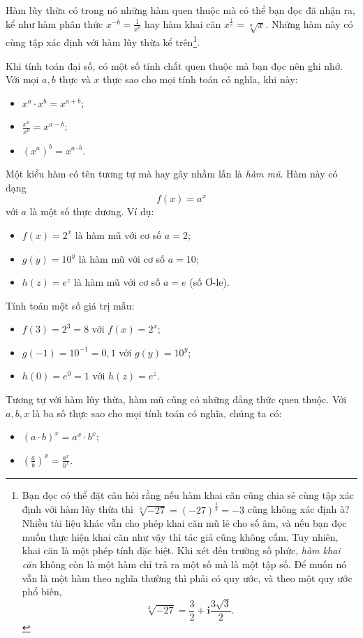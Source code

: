 Hàm lũy thừa có trong nó những hàm quen thuộc mà có thể bạn đọc đã nhận ra, kể như hàm phân thức $x^{-b} = \frac{1}{x^b}$ hay hàm khai căn $x^{\frac{1}{c}} = \sqrt[n]{x}$. Những hàm này có cùng tập xác định với hàm lũy thừa kể trên\footnote{Bạn đọc có thể đặt câu hỏi rằng nếu hàm khai căn cũng chia sẻ cùng tập xác định với hàm lũy thừa thì $\sqrt[3]{-27} = (-27)^{\frac{1}{3}} = -3$ cũng không xác định à? Nhiều tài liệu khác vẫn cho phép khai căn mũ lẻ cho số âm, và nếu bạn đọc muốn thực hiện khai căn như vậy thì tác giả cũng không cấm. Tuy nhiên, khai căn là một phép tính đặc biệt. Khi xét đến trường số phức, \textit{hàm khai căn} không còn là một hàm chỉ trả ra một số mà là một tập số. Để muốn nó vẫn là một hàm theo nghĩa thường thì phải có quy ước, và theo một quy ước phổ biến, $$\sqrt[3]{-27} = \frac{3}{2} + \mathbf{i}\frac{3\sqrt{3}}{2}.$$}.

Khi tính toán đại số, có một số tính chất quen thuộc mà bạn đọc nên ghi nhớ. Với mọi $a, b$ thực và $x$ thực sao cho mọi tính toán có nghĩa, khi này:
\begin{itemize}
   \item $x^a\cdot x^b = x^{a+b}$;
   \item $\frac{x^a}{x^b} = x^{a - b}$;
   \item $(x^a)^b = x^{a\cdot b}$.
\end{itemize}

Một kiểu hàm có tên tương tự mà hay gây nhầm lẫn là \emph{hàm mũ}. Hàm này có dạng $$f(x) = a^x$$ với $a$ là một số thực dương. Ví dụ:
\begin{itemize}
   \item $f(x) = 2^x$ là hàm mũ với cơ số $a = 2$;
   \item $g(y) = 10^y$ là hàm mũ với cơ số $a = 10$;
   \item $h(z) = e^z$ là hàm mũ với cơ số $a = e$ (số Ơ-le).
\end{itemize}
Tính toán một số giá trị mẫu:
\begin{itemize}
   \item $f(3) = 2^3 = 8$ với $f(x) = 2^x$;
   \item $g(-1) = 10^{-1} = 0,1$ với $g(y) = 10^y$;
   \item $h(0) = e^0 = 1$ với $h(z) = e^z$.
\end{itemize}
Tương tự với hàm lũy thừa, hàm mũ cũng có những đẳng thức quen thuộc. Với $a, b, x$ là ba số thực sao cho mọi tính toán có nghĩa, chúng ta có:
\begin{itemize}
   \item $(a\cdot b)^x=a^x\cdot b^x$;
   \item $\left(\frac{a}{b}\right)^x = \frac{a^x}{b^x}$.
\end{itemize}

